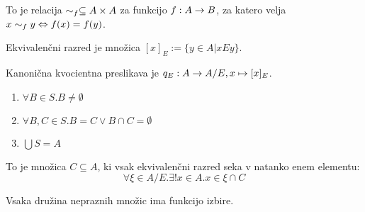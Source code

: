 To je relacija $\sim_f \subseteq A\times A$ za funkcijo $f:A\to B$, za katero velja $x \sim_f y \Leftrightarrow f(x) = f(y)$.


Ekvivalenčni razred je množica $[x]_E := \{y \in A | x E y\}$.

Kanonična kvocientna preslikava je $q_E : A \to A/E, x \mapsto [x]_E$.


\begin{enumerate}
	\item $\forall B \in S. B \ne \emptyset$
	\item $\forall B, C \in S. B = C \lor B \cap C = \emptyset$
	\item $\bigcup S = A$
\end{enumerate}


To je množica $C \subseteq A$, ki vsak ekvivalenčni razred seka v natanko enem elementu: \[\forall \xi \in A/E. \exists! x \in A. x\in \xi \cap C\]


Vsaka družina nepraznih množic ima funkcijo izbire.